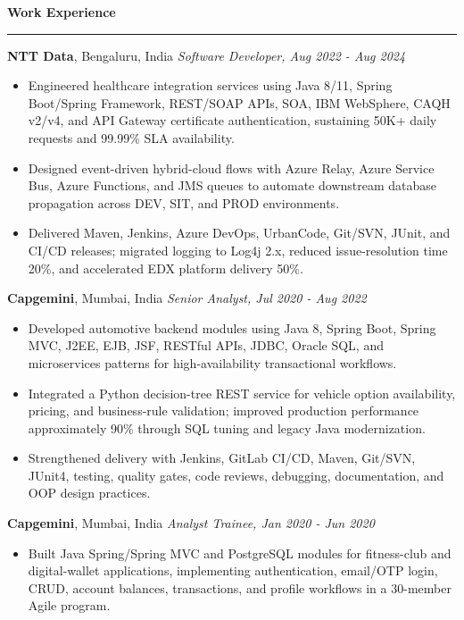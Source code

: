 \documentclass[10pt,letterpaper]{article}
\newcommand{\ressection}[1]{\vspace{3pt}\par\textbf{#1}\par\vspace{0.9pt}\hrule\vspace{1.8pt}}
\begin{document}
\ressection{Work Experience}
\textbf{NTT Data}, Bengaluru, India \hfill \textit{Software Developer, Aug 2022 - Aug 2024}
\begin{itemize}
  \item Engineered healthcare integration services using Java 8/11, Spring Boot/Spring Framework, REST/SOAP APIs, SOA, IBM WebSphere, CAQH v2/v4, and API Gateway certificate authentication, sustaining 50K+ daily requests and 99.99\% SLA availability.
  \item Designed event-driven hybrid-cloud flows with Azure Relay, Azure Service Bus, Azure Functions, and JMS queues to automate downstream database propagation across DEV, SIT, and PROD environments.
  \item Delivered Maven, Jenkins, Azure DevOps, UrbanCode, Git/SVN, JUnit, and CI/CD releases; migrated logging to Log4j 2.x, reduced issue-resolution time 20\%, and accelerated EDX platform delivery 50\%.
\end{itemize}
\textbf{Capgemini}, Mumbai, India \hfill \textit{Senior Analyst, Jul 2020 - Aug 2022}
\begin{itemize}
  \item Developed automotive backend modules using Java 8, Spring Boot, Spring MVC, J2EE, EJB, JSF, RESTful APIs, JDBC, Oracle SQL, and microservices patterns for high-availability transactional workflows.
  \item Integrated a Python decision-tree REST service for vehicle option availability, pricing, and business-rule validation; improved production performance approximately 90\% through SQL tuning and legacy Java modernization.
  \item Strengthened delivery with Jenkins, GitLab CI/CD, Maven, Git/SVN, JUnit4, testing, quality gates, code reviews, debugging, documentation, and OOP design practices.
\end{itemize}
\textbf{Capgemini}, Mumbai, India \hfill \textit{Analyst Trainee, Jan 2020 - Jun 2020}
\begin{itemize}
  \item Built Java Spring/Spring MVC and PostgreSQL modules for fitness-club and digital-wallet applications, implementing authentication, email/OTP login, CRUD, account balances, transactions, and profile workflows in a 30-member Agile program.
\end{itemize}
\end{document}
